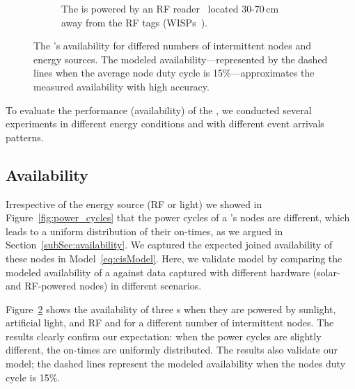 \begin{figure}[h]
\begin{subfigure}{.66\columnwidth}
                \caption{The \cis is powered by an RF reader~\cite{r420_website} located 30-70\,cm away from the RF tags (WISPs~\cite{smith2006wirelessly}).}
            \label{fig:rfPwrCIS}
        \end{subfigure}
        \caption{The \fullcis's availability for differed numbers of intermittent nodes and energy sources. 
        The modeled availability---represented by the dashed lines when the average node duty cycle is 15\%---approximates the measured availability with high accuracy.}
        \label{fig:pwrCIS}
\end{figure} 
To evaluate the performance (availability) of the \fullcis, we conducted several experiments in different energy conditions and with different event arrivals patterns. 
%
\subsection{Availability}
Irrespective of the energy source (RF or light) we showed in Figure~\ref{fig:power_cycles} that the power cycles of a \cis's nodes are different, which leads to a uniform distribution of their on-times, as we argued in Section~\ref{subSec:availability}. We captured the expected joined availability of these nodes in Model~\ref{eq:cisModel}.  Here, we validate model by comparing the modeled availability of a \cis against data captured with different hardware (solar- and RF-powered nodes) in different scenarios.
 
Figure~\ref{fig:pwrCIS} shows the availability of three \cis{}s when they are powered by sunlight, artificial light, and RF and for a different number of intermittent nodes.
The results clearly confirm our expectation: when the power cycles are slightly different, the on-times are uniformly distributed. The results also validate our model; the dashed lines represent the modeled availability when the nodes duty cycle is 15\%.


